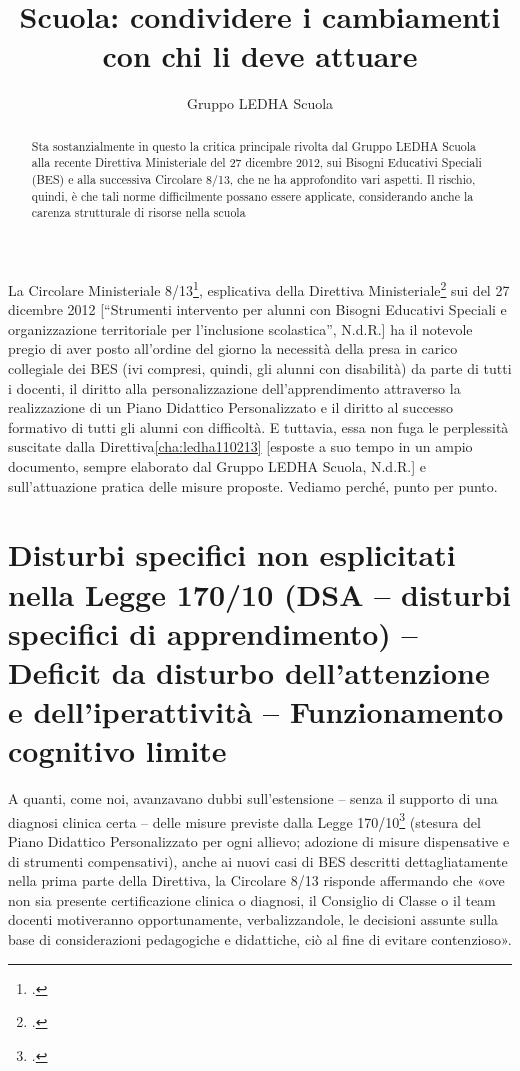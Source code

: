 \author{Gruppo LEDHA Scuola}
\title{Scuola: condividere i cambiamenti con chi li deve attuare}
\label{cha:ledha040413}
\begin{abstract}
Sta sostanzialmente in questo la critica principale rivolta dal Gruppo LEDHA Scuola alla recente Direttiva Ministeriale del 27 dicembre 2012, sui Bisogni Educativi Speciali (BES) e alla successiva Circolare 8/13, che ne ha approfondito vari aspetti. Il rischio, quindi, è che tali norme difficilmente possano essere applicate, considerando anche la carenza strutturale di risorse nella scuola
\end{abstract}
\maketitle
La Circolare Ministeriale 8/13\footcite{cm8_2013}, esplicativa della Direttiva Ministeriale\footcite{dir27Dic2012} sui  del 27 dicembre 2012 [“Strumenti intervento per alunni con Bisogni Educativi Speciali e organizzazione territoriale per l'inclusione scolastica”, N.d.R.] ha il notevole pregio di aver posto all'ordine del giorno la necessità della presa in carico collegiale dei BES (ivi compresi, quindi, gli alunni con disabilità) da parte di tutti i docenti, il diritto alla personalizzazione dell'apprendimento attraverso la realizzazione di un Piano Didattico Personalizzato e il diritto al successo formativo di tutti gli alunni con difficoltà. E tuttavia, essa non fuga le perplessità suscitate dalla Direttiva\ref{cha:ledha110213} [esposte a suo tempo in un ampio documento, sempre elaborato dal Gruppo LEDHA Scuola, N.d.R.] e sull'attuazione pratica delle misure proposte. Vediamo perché, punto per punto.
\section*{ Disturbi specifici non esplicitati nella Legge 170/10 (DSA – disturbi specifici di apprendimento) – Deficit da disturbo dell'attenzione e dell'iperattività – Funzionamento cognitivo limite}
	A quanti, come noi, avanzavano dubbi sull'estensione – senza il supporto di una diagnosi clinica certa – delle misure previste dalla Legge 170/10\footcite{legge170} (stesura del Piano Didattico Personalizzato per ogni allievo; adozione di misure dispensative e di strumenti compensativi), anche ai nuovi casi di BES descritti dettagliatamente nella prima parte della Direttiva, la Circolare 8/13 risponde affermando che «ove non sia presente certificazione clinica o diagnosi, il Consiglio di Classe o il team docenti motiveranno opportunamente, verbalizzandole, le decisioni assunte sulla base di considerazioni pedagogiche e didattiche, ciò al fine di evitare contenzioso».

